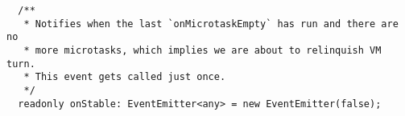 \begin{verbatim}
  /**
   * Notifies when the last `onMicrotaskEmpty` has run and there are no
   * more microtasks, which implies we are about to relinquish VM turn.
   * This event gets called just once.
   */
  readonly onStable: EventEmitter<any> = new EventEmitter(false);
\end{verbatim}
